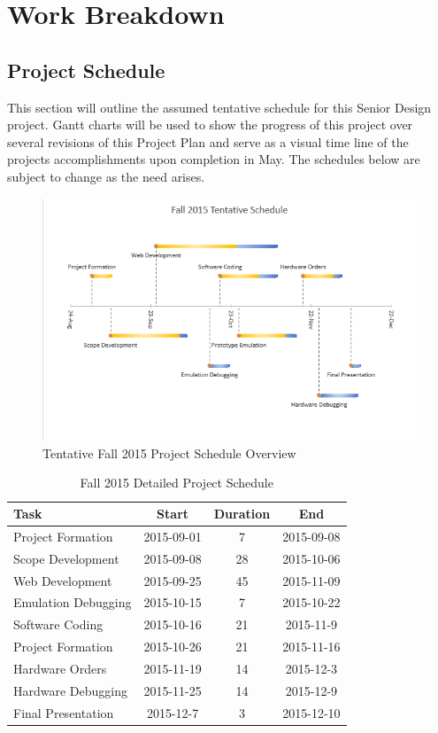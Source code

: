 \chapter{Work Breakdown}

\section{Project Schedule}


This section will outline the assumed tentative schedule for this Senior Design project. Gantt charts will be used to show the progress of this project over several revisions of this Project Plan and serve as a visual time line of the projects accomplishments upon completion in May. The schedules below are subject to change as the need arises. 

\begin{figure}[!ht]
\centering
\includegraphics[scale=0.65]{./figures/fall-timeline}
\caption{Tentative Fall 2015 Project Schedule Overview}
\label{figure:fall-timeline}
\end{figure}

\begin{table}
\centering
\begin{tabular}{l  c  c  c}
Task & Start & Duration & End \\
\hline
Project Formation & 2015-09-01 & 7 & 2015-09-08 \\
Scope Development & 2015-09-08 & 28 & 2015-10-06 \\
Web Development & 2015-09-25 & 45 & 2015-11-09 \\
Emulation Debugging & 2015-10-15 & 7 & 2015-10-22 \\
Software Coding & 2015-10-16 & 21 & 2015-11-9 \\
Project Formation & 2015-10-26 & 21 & 2015-11-16 \\
Hardware Orders & 2015-11-19 & 14 & 2015-12-3 \\
Hardware Debugging & 2015-11-25 & 14 & 2015-12-9 \\
Final Presentation & 2015-12-7 & 3 & 2015-12-10 \\
\end{tabular}
\caption{Fall 2015 Detailed Project Schedule}
\label{table:risk}
\end{table}
\vspace{0.3cm}

